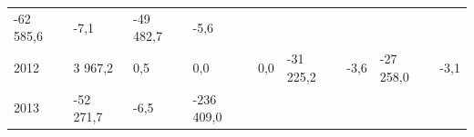 \begin{longtable}[]{@{}lllllllll@{}}
\begin{minipage}[t]{0.12\columnwidth}
-62 585,6\strut
\end{minipage} & \begin{minipage}[t]{0.06\columnwidth}\raggedright
-7,1\strut
\end{minipage} & \begin{minipage}[t]{0.09\columnwidth}\raggedright
-49 482,7\strut
\end{minipage} & \begin{minipage}[t]{0.06\columnwidth}\raggedright
-5,6\strut
\end{minipage}\tabularnewline
\begin{minipage}[t]{0.05\columnwidth}\raggedright
2012\strut
\end{minipage} & \begin{minipage}[t]{0.10\columnwidth}\raggedright
3 967,2\strut
\end{minipage} & \begin{minipage}[t]{0.06\columnwidth}\raggedright
0,5\strut
\end{minipage} & \begin{minipage}[t]{0.16\columnwidth}\raggedright
0,0\strut
\end{minipage} & \begin{minipage}[t]{0.06\columnwidth}\raggedright
0,0\strut
\end{minipage} & \begin{minipage}[t]{0.12\columnwidth}\raggedright
-31 225,2\strut
\end{minipage} & \begin{minipage}[t]{0.06\columnwidth}\raggedright
-3,6\strut
\end{minipage} & \begin{minipage}[t]{0.09\columnwidth}\raggedright
-27 258,0\strut
\end{minipage} & \begin{minipage}[t]{0.06\columnwidth}\raggedright
-3,1\strut
\end{minipage}\tabularnewline
\begin{minipage}[t]{0.05\columnwidth}\raggedright
2013\strut
\end{minipage} & \begin{minipage}[t]{0.10\columnwidth}\raggedright
-52 271,7\strut
\end{minipage} & \begin{minipage}[t]{0.06\columnwidth}\raggedright
-6,5\strut
\end{minipage} & \begin{minipage}[t]{0.16\columnwidth}\raggedright
-236 409,0\strut
\end{minipage} & \begin{minipage}[t]{0.06\columnwidth}\raggedright

\end{minipage}
\end{longtable}
